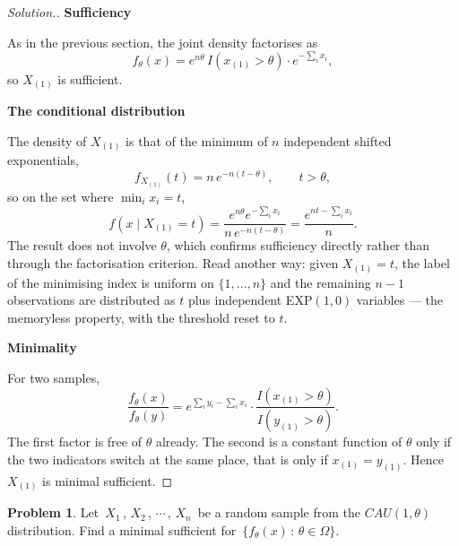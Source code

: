 \documentclass[12pt,a4paper]{report}
\theoremstyle{definition}
\newcommand{\subhead}[1]{%
  \par\medskip\noindent\textbf{#1}\par\nobreak\smallskip}
\newtheorem{problemx}{Problem}[section]
\newenvironment{problem}{\begin{problemx}}{\end{problemx}}
\newenvironment{solution}
  {\renewcommand{\qedsymbol}{}\begin{proof}[\textit{Solution}.]}
  {\end{proof}}
\begin{document}
\begin{solution}
\subhead{Sufficiency}
As in the previous section, the joint density factorises as
\[f_{\theta}(x) = e^{n\theta}\,I\left(x_{(1)}>\theta\right)\cdot e^{-\sum_i x_i},\]
so $X_{(1)}$ is sufficient.

\subhead{The conditional distribution}
The density of $X_{(1)}$ is that of the minimum of $n$ independent shifted
exponentials,
\[f_{X_{(1)}}(t) = n\,e^{-n(t-\theta)},\qquad t>\theta ,\]
so on the set where $\min_i x_i = t$,
\[f\left(x \mid X_{(1)}=t\right)
= \frac{e^{n\theta}e^{-\sum_i x_i}}{n\,e^{-n(t-\theta)}}
= \frac{e^{nt-\sum_i x_i}}{n} .\]
The result does not involve $\theta$, which confirms sufficiency directly rather
than through the factorisation criterion. Read another way: given
$X_{(1)}=t$, the label of the minimising index is uniform on $\{1,\dots,n\}$ and
the remaining $n-1$ observations are distributed as $t$ plus independent
EXP$(1,0)$ variables --- the memoryless property, with the threshold reset to
$t$.

\subhead{Minimality}
For two samples,
\[\frac{f_{\theta}(x)}{f_{\theta}(y)}
= e^{\sum_i y_i - \sum_i x_i}\cdot
\frac{I\left(x_{(1)}>\theta\right)}{I\left(y_{(1)}>\theta\right)} .\]
The first factor is free of $\theta$ already. The second is a constant function
of $\theta$ only if the two indicators switch at the same place, that is only if
$x_{(1)} = y_{(1)}$. Hence $X_{(1)}$ is minimal sufficient.
\end{solution}

\begin{problem}
Let $\, X_1\, , \, X_2\, , \, \cdots \, , \, X_n\,$ be a random sample from the $CAU(1,\theta)$ distribution. Find a minimal sufficient for $\, \{f_{\theta}(x)\, :\, \theta\in \Omega\}$.
\end{problem}
\end{document}

